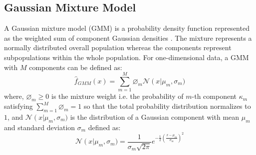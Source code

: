 \subsection{Gaussian Mixture Model}\label{sec:GMM}
A Gaussian mixture model (GMM) is a probability density function represented as the weighted sum of component Gaussian densities  \cite{Reynolds2009}. The mixture represents a normally distributed overall population whereas the components represent subpopulations within the whole population. For one-dimensional data, a GMM with $M$ components can be defined as:
\begin{equation}
	\hat{f}_{GMM}\left(x\right) =  \sum_{m = 1}^{M}\varnothing_{m}\mathcal{N}\left(x\right\vert  \mu_{m},\sigma_{m})
\end{equation}
where, \(\varnothing_{m} \geq 0\) is the mixture weight i.e. the probability of \( m\)-th component \( \kappa_{m}\) satisfying \( \sum_{m = 1}^{M}\varnothing_{m} = 1\)  so that the total probability distribution normalizes to $1$, and \(\mathcal{N}\left(x\right\vert  \mu_{m},\sigma_{m})\) is the distribution of a Gaussian component with mean \( \mu_{m}\) and standard deviation \( \sigma_{m}\) defined as:
\begin{equation}
	\mathcal{N}\left(x\right\vert  \mu_{m},\sigma_{m}) =\frac{1}{\sigma_{m}\sqrt{2\pi }}e^{-\frac{1}{2}\left(\frac{x-\mu_{m}}{\sigma_{m}}\right)^{2}}
\end{equation}

